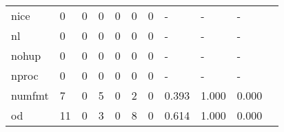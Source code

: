 \begin{longtable}{lp{1.20cm}p{1.20cm}p{1.20cm}p{1.20cm}p{1.20cm}p{1.20cm}p{1.20cm}p{1.20cm}p{1.20cm}p{1.20cm}}
nice      &                                     0 &                                                  0 &                                                  0 &                                                  0 &                                                  0 &                                                  0 &                                             - &                                                  - &                                                  - \\
nl        &                                     0 &                                                  0 &                                                  0 &                                                  0 &                                                  0 &                                                  0 &                                             - &                                                  - &                                                  - \\
nohup     &                                     0 &                                                  0 &                                                  0 &                                                  0 &                                                  0 &                                                  0 &                                             - &                                                  - &                                                  - \\
nproc     &                                     0 &                                                  0 &                                                  0 &                                                  0 &                                                  0 &                                                  0 &                                             - &                                                  - &                                                  - \\
numfmt    &                                     7 &                                                  0 &                                                  5 &                                                  0 &                                                  2 &                                                  0 &                                         0.393 &                                              1.000 &                                              0.000 \\
od        &                                    11 &                                                  0 &                                                  3 &                                                  0 &                                                  8 &                                                  0 &                                         0.614 &                                              1.000 &                                              0.000 \\

\end{longtable}
